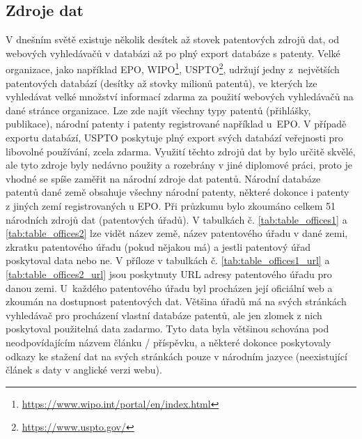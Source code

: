\subsection{Zdroje dat}
V dnešním světě existuje několik desítek až stovek patentových zdrojů dat, od webových vyhledávačů v databázi až po plný export databáze s patenty. Velké organizace, jako například \gls{EPO}, \gls{WIPO}\footnote{\href{https://www.wipo.int/portal/en/index.html}{https://www.wipo.int/portal/en/index.html}}, \gls{USPTO}\footnote{\href{https://www.uspto.gov/}{https://www.uspto.gov/}}, udržují jedny z~největších patentových databází (desítky až stovky milionů patentů), ve kterých lze vyhledávat velké množství informací zdarma za použití webových vyhledávačů na dané stránce organizace. Lze zde najít všechny typy patentů (přihlášky, publikace), národní patenty i patenty registrované například u~\gls{EPO}. V případě exportu databází, \gls{USPTO} poskytuje plný export svých databází veřejnosti pro libovolné používání, zcela zdarma. Využití těchto zdrojů dat by bylo určitě skvělé, ale tyto zdroje byly nedávno použity a rozebrány v jiné diplomové práci, proto je vhodné se spíše zaměřit na národní zdroje dat patentů.
\newline
\indent Národní databáze patentů dané země obsahuje všechny národní patenty, některé dokonce i patenty z jiných zemí registrovaných u \gls{EPO}. 
\newline
\indent Při průzkumu bylo zkoumáno celkem 51 národních zdrojů dat (patentových úřadů). V tabulkách č. \ref{tab:table_offices1} a \ref{tab:table_offices2} lze vidět název země, název patentového úřadu v dané zemi, zkratku patentového úřadu (pokud nějakou má) a jestli patentový úřad poskytoval data nebo ne. V příloze v tabulkách č. \ref{tab:table_offices1_url} a \ref{tab:table_offices2_url} jsou poskytnuty URL adresy patentového úřadu pro danou zemi. U~každého patentového úřadu byl procházen její oficiální web a zkoumán na dostupnost patentových dat. Většina úřadů má na svých stránkách vyhledávač pro procházení vlastní databáze patentů, ale jen zlomek z nich poskytoval použitelná data zadarmo. Tyto data byla většinou schována pod neodpovídajícím názvem článku / příspěvku, a některé dokonce poskytovaly odkazy ke stažení dat na svých stránkách pouze v národním jazyce (neexistující článek s daty v anglické verzi webu). 
\newpage
